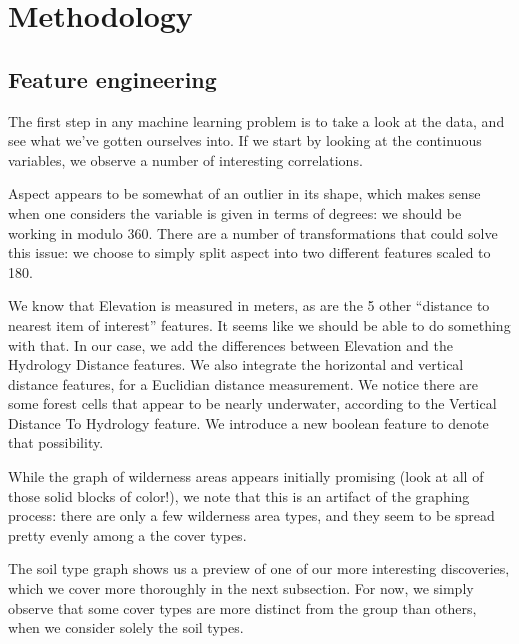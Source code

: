 \section{Methodology}
\label{sec:-method}

\subsection{Feature engineering}
The first step in any machine learning problem is to take a look at the 
data, and see what we've gotten ourselves into.  If we start by looking 
at the continuous variables, we observe a number of interesting 
correlations.  

Aspect appears to be somewhat of an outlier in its shape, 
which makes sense when one considers the variable is given in terms of 
degrees: we should be working in modulo 360.  There are a number of 
transformations that could solve this issue: we choose to simply split 
aspect into two different features scaled to 180\degree.

We know that Elevation is measured in meters, as are the 5 other 
``distance to nearest item of interest'' features.  It seems like we 
should be able to do something with that.  In our case, we add the 
differences between Elevation and the Hydrology Distance features.  We 
also integrate the horizontal and vertical distance features, for a 
Euclidian distance measurement. We notice there are some forest cells 
that appear to be nearly underwater, according to the Vertical Distance 
To Hydrology feature.  We introduce a new boolean feature to denote 
that possibility.  

While the graph of wilderness areas appears initially promising (look 
at all of those solid blocks of color!), we note that this is an 
artifact of the graphing process: there are only a few wilderness area 
types, and they seem to be spread pretty evenly among a the cover types.

The soil type graph shows us a preview of one of our more interesting 
discoveries, which we cover more thoroughly in the next subsection. For 
now, we simply observe that some cover types are more distinct from the 
group than others, when we consider solely the soil types.


